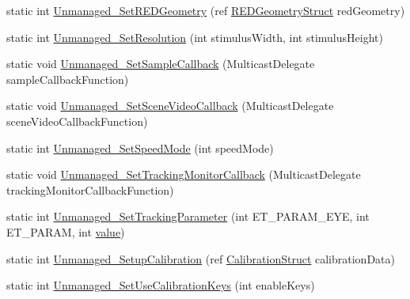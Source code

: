 \begin{DoxyCompactItemize}
\item 
static int \hyperlink{class_web_analyzer_1_1_eye_tracking_1_1_eye_tracking_controller_a2f7f569970d235b646daa0c9d26e0716}{Unmanaged\+\_\+\+Set\+R\+E\+D\+Geometry} (ref \hyperlink{struct_web_analyzer_1_1_eye_tracking_1_1_eye_tracking_controller_1_1_r_e_d_geometry_struct}{R\+E\+D\+Geometry\+Struct} red\+Geometry)
\item 
static int \hyperlink{class_web_analyzer_1_1_eye_tracking_1_1_eye_tracking_controller_a458be776577bc4115adf38f40f3004c7}{Unmanaged\+\_\+\+Set\+Resolution} (int stimulus\+Width, int stimulus\+Height)
\item 
static void \hyperlink{class_web_analyzer_1_1_eye_tracking_1_1_eye_tracking_controller_a705bb2e4e3604942aad41bc9dba9ba9c}{Unmanaged\+\_\+\+Set\+Sample\+Callback} (Multicast\+Delegate sample\+Callback\+Function)
\item 
static void \hyperlink{class_web_analyzer_1_1_eye_tracking_1_1_eye_tracking_controller_aae35a38c3732a9be798da0d94f42e4ed}{Unmanaged\+\_\+\+Set\+Scene\+Video\+Callback} (Multicast\+Delegate scene\+Video\+Callback\+Function)
\item 
static int \hyperlink{class_web_analyzer_1_1_eye_tracking_1_1_eye_tracking_controller_afc4a3a345fe06a857c604a306eb31ed3}{Unmanaged\+\_\+\+Set\+Speed\+Mode} (int speed\+Mode)
\item 
static void \hyperlink{class_web_analyzer_1_1_eye_tracking_1_1_eye_tracking_controller_ad1f74ac5fcc5f50c2e9a4b43e92641f8}{Unmanaged\+\_\+\+Set\+Tracking\+Monitor\+Callback} (Multicast\+Delegate tracking\+Monitor\+Callback\+Function)
\item 
static int \hyperlink{class_web_analyzer_1_1_eye_tracking_1_1_eye_tracking_controller_ae57acf2181c6ca768336ff5ef632fa2c}{Unmanaged\+\_\+\+Set\+Tracking\+Parameter} (int E\+T\+\_\+\+P\+A\+R\+A\+M\+\_\+\+E\+Y\+E, int E\+T\+\_\+\+P\+A\+R\+A\+M, int \hyperlink{_u_i_2_h_t_m_l_resources_2js_2lib_2underscore_8min_8js_af7e1471ab89699458c4df8bb657298f6}{value})
\item 
static int \hyperlink{class_web_analyzer_1_1_eye_tracking_1_1_eye_tracking_controller_a8cefedc555f2c8bc2ba579c34971f436}{Unmanaged\+\_\+\+Setup\+Calibration} (ref \hyperlink{struct_web_analyzer_1_1_eye_tracking_1_1_eye_tracking_controller_1_1_calibration_struct}{Calibration\+Struct} calibration\+Data)
\item 
static int \hyperlink{class_web_analyzer_1_1_eye_tracking_1_1_eye_tracking_controller_a7ee1128d6e196421725430354a5d5c2a}{Unmanaged\+\_\+\+Set\+Use\+Calibration\+Keys} (int enable\+Keys)

\end{DoxyCompactItemize}

